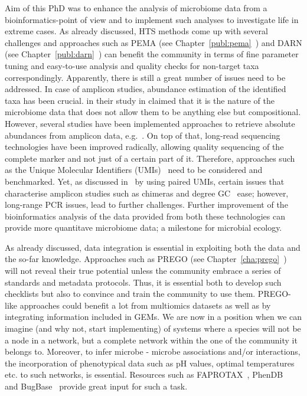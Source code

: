    Aim of this PhD was to enhance the analysis of microbiome data from a bioinformatics-point of view
   and to implement such analyses to investigate life in extreme cases. 
   As already discussed, HTS methods come up with several challenges and 
   approaches such as PEMA (see Chapter~\ref{publ:pema}~\citep{zafeiropoulos2020pema}) and 
   DARN (see Chapter~\ref{publ:darn}~\citep{zafeiropoulos2021dark}) can benefit the community 
   in terms of fine parameter tuning and easy-to-use analysis and 
   quality checks for non-target taxa correspondingly. 
   Apparently, there is still a great number of issues need to be addressed.
   In case of amplicon studies, abundance estimation of the identified taxa has been crucial.
   \citeauthor{gloor2017microbiome} in their study in \citeyear{gloor2017microbiome} 
   claimed that it is the nature of the microbiome data that does not allow them to be anything else but compositional. 
   However, several studies have been implemented approaches to retrieve 
   absolute abundances from amplicon data, e.g.~\citep{kim2021measuring, zemb2020absolute}.
   On top of that, long-read sequencing technologies have been improved radically, 
   allowing quality sequencing of the complete marker and not just of a certain part of it. 
   Therefore, approaches such as the Unique Molecular Identifiers (UMIs)~\citep{hiatt2010parallel} 
   need to be considered and benchmarked. 
   Yet, as discussed in~\citep{karst2021high}  
   by using paired UMIs, certain issues that characterise amplicon studies 
   such as chimeras and degree GC~\citep{benita2003regionalized} ease; 
   however, long-range PCR issues, 
   lead to further challenges. 
   Further improvement of the bioinformatics analysis of the data provided from both these technologies
   can provide more quantitave microbiome data; a milestone for microbial ecology. 

   As already discussed, data integration is essential in 
   exploiting both the data and the so-far knowledge. 
   Approaches such as PREGO (see Chapter~\ref{cha:prego}~\citep{zafeiropoulos_prego_2022}) 
   will not reveal their true potential unless the community embrace a series of standards and 
   metadata protocols. 
   Thus, it is essential both to develop such checklists 
   but also to convince and train the community to use them. 
   PREGO-like approaches could benefit a lot from multiomics datasets 
   as well as by integrating information included in GEMs.
   We are now in a position when we can imagine (and why not, start implementing)
   of systems where a species will not be a node in a network, 
   but a complete network within the one of the community it belongs to.
   Moreover, to infer microbe - microbe associations and/or interactions,
   the incorporation of phenotypical data 
   such as pH values, optimal temperatures etc. to such networks, 
   is essential. 
   Resources such as FAPROTAX~\citep*{louca2016decoupling}, PhenDB~\citep{feldbauer2015prediction}
   and BugBase~\citep{Ward133462} provide great input for such a task. 

